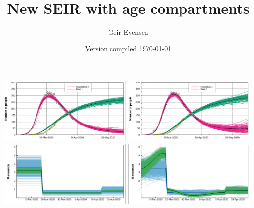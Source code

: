 \documentclass[twoside,11pt]{article}
\begin{document}
\setlength{\parskip}{3mm} 

\title{New SEIR with age compartments }
\author{Geir Evensen}

\date{Version compiled \today}

\maketitle

\begin{center}
\includegraphics[width=0.49\textwidth]{D1.png} \includegraphics[width=0.49\textwidth]{D2.png} \\
\includegraphics[width=0.49\textwidth]{R1.png} \includegraphics[width=0.49\textwidth]{R2.png}
\end{center}

\newpage
\end{document}
